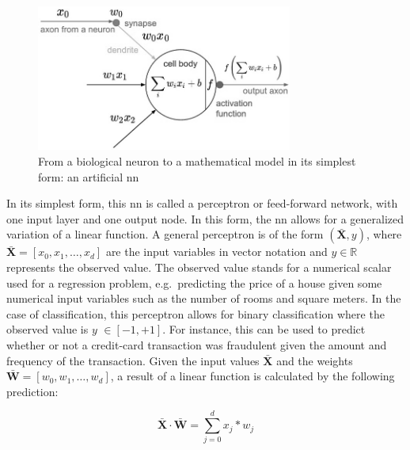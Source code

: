 \documentclass[draft,final]{vutinfth} %
\begin{document}
    \begin{figure}[h]
        \centering
        \includegraphics[width=0.75\textwidth]{figures/neuron_model.png}
        \caption[From a biological neuron to a mathematical model: an artificial \acrlong{nn} in its simplest form]{From a biological neuron to a mathematical model in its simplest form: an artificial \gls{nn}\protect\footnotemark}
        \label{fig:neuron_model}
    \end{figure}


    In its simplest form, this \gls{nn} is called a perceptron or feed-forward network, with one input layer and one output node.
    In this form, the \gls{nn} allows for a generalized variation of a linear function.
    A general perceptron is of the form $(\bar{\boldsymbol{X}},y)$, where $\bar{\boldsymbol{X}}=[x_0,x_1,\ldots,x_d]$ are the input variables in vector notation and $y \in \mathbb{R}$  represents the observed value.
    The observed value stands for a numerical scalar used for a regression problem, e.g.\ predicting the price of a house given some numerical input variables such as the number of rooms and square meters.
    In the case of classification, this perceptron allows for binary classification where the observed value is $y$ $\in [-1,+1]$.
    For instance, this can be used to predict whether or not a credit-card transaction was fraudulent given the amount and frequency of the transaction.
    Given the input values $\bar{\boldsymbol{X}}$ and the weights $\bar{\boldsymbol{W}}=[w_0,w_1,\ldots,w_d]$, a result of a linear function is calculated by the following prediction:

    \begin{equation}
        \bar{\boldsymbol{X}}\cdot\bar{\boldsymbol{W}}=\sum_{j=0}^{d}x_j*w_j\label{eq:feed_forward_equation}
    \end{equation}
\end{document}
